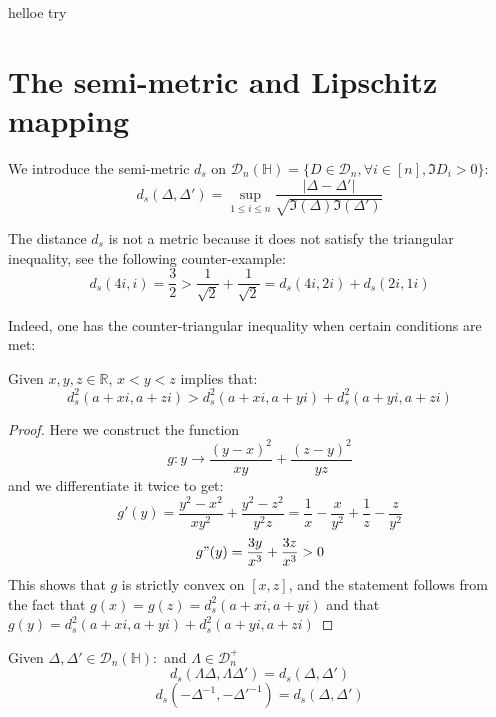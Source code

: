 \documentclass[ECP, preprint]{ejpecp} %
\begin{document}
helloe try
\section{The semi-metric and Lipschitz mapping}
We introduce the semi-metric $d_s$ on $\mathcal{D}_n(\mathbb{H})=\{D\in \mathcal{D}_n,\forall i \in [n],\Im{D}_i>0\}$:
$$d_s(\Delta,\Delta')=\sup_{1\leq i\leq n}\frac{|\Delta-\Delta'|}{\sqrt{\Im(\Delta)\Im(\Delta')}}$$

The distance $d_s$ is not a metric because it does not satisfy the triangular inequality, see the following counter-example:
$$d_s(4i,i)=\frac{3}{2}>\frac{1}{\sqrt{2}}+\frac{1}{\sqrt{2}}=d_s(4i,2i)+d_s(2i,1i)$$

Indeed, one has the counter-triangular inequality when certain conditions are met:
\begin{lemma}
    Given $x,y,z\in \mathbb{R}$, $x<y<z$ implies that:
    $$d^2_s(a+xi,a+zi)>d^2_s(a+xi,a+yi)+d^2_s(a+yi,a+zi)$$
\end{lemma}
\begin{proof}
    Here we construct the function
    $$g:y\to \frac{(y-x)^2}{xy}+\frac{(z-y)^2}{yz}$$
and we differentiate it twice to get:
$$g'(y)=\frac{y^2-x^2}{xy^2}+\frac{y^2-z^2}{y^2z}=\frac{1}{x}-\frac{x}{y^2}+\frac{1}{z}-\frac{z}{y^2}$$
$$g"(y)=\frac{3y}{x^3}+\frac{3z}{x^3}>0$$
This shows that $g$ is strictly convex on $[x,z]$, and the statement follows from the fact that $g(x)=g(z)=d^2_s(a+xi,a+yi)$ and that $g(y)=d^2_s(a+xi,a+yi)+d^2_s(a+yi,a+zi)$
\end{proof}




\begin{lemma}
    Given $\Delta,\Delta'\in \mathcal{D}_n(\mathbb{H}):$ and $\Lambda\in \mathcal{D}^+_n$
    $$d_s(\Lambda\Delta,\Lambda\Delta')=d_s(\Delta,\Delta')$$ 
    $$d_s(-\Delta^{-1},-\Delta'^{-1})=d_s(\Delta,\Delta')$$
\end{lemma}
\end{document}
